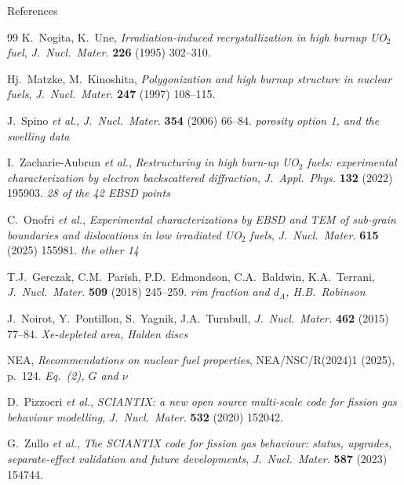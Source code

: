 \documentclass[10pt,aspectratio=169]{beamer}
\begin{document}
\begin{frame}[allowframebreaks]{References}
\begin{thebibliography}{99}
     K.\ Nogita, K.\ Une,
      \emph{Irradiation-induced recrystallization in high burnup UO$_2$ fuel},
      \emph{J.\ Nucl.\ Mater.} \textbf{226} (1995) 302--310.

     Hj.\ Matzke, M.\ Kinoshita,
      \emph{Polygonization and high burnup structure in nuclear fuels},
      \emph{J.\ Nucl.\ Mater.} \textbf{247} (1997) 108--115.

     J.\ Spino \emph{et al.},
      \emph{J.\ Nucl.\ Mater.} \textbf{354} (2006) 66--84.
      \hfill{\itshape porosity option 1, and the swelling data}

     I.\ Zacharie-Aubrun \emph{et al.},
      \emph{Restructuring in high burn-up UO$_2$ fuels: experimental characterization by
      electron backscattered diffraction},
      \emph{J.\ Appl.\ Phys.} \textbf{132} (2022) 195903.
      \hfill{\itshape 28 of the 42 EBSD points}

     C.\ Onofri \emph{et al.},
      \emph{Experimental characterizations by EBSD and TEM of sub-grain boundaries and
      dislocations in low irradiated UO$_2$ fuels},
      \emph{J.\ Nucl.\ Mater.} \textbf{615} (2025) 155981.
      \hfill{\itshape the other 14}

     T.J.\ Gerczak, C.M.\ Parish, P.D.\ Edmondson, C.A.\ Baldwin, K.A.\ Terrani,
      \emph{J.\ Nucl.\ Mater.} \textbf{509} (2018) 245--259.
      \hfill{\itshape rim fraction and $d_A$, H.B.\ Robinson}

     J.\ Noirot, Y.\ Pontillon, S.\ Yagnik, J.A.\ Turnbull,
      \emph{J.\ Nucl.\ Mater.} \textbf{462} (2015) 77--84.
      \hfill{\itshape Xe-depleted area, Halden discs}

     NEA,
      \emph{Recommendations on nuclear fuel properties}, NEA/NSC/R(2024)1 (2025), p.\ 124.
      \hfill{\itshape Eq.~(2), $G$ and $\nu$}

     D.\ Pizzocri \emph{et al.},
      \emph{SCIANTIX: a new open source multi-scale code for fission gas behaviour modelling},
      \emph{J.\ Nucl.\ Mater.} \textbf{532} (2020) 152042.

     G.\ Zullo \emph{et al.},
      \emph{The SCIANTIX code for fission gas behaviour: status, upgrades, separate-effect
      validation and future developments},
      \emph{J.\ Nucl.\ Mater.} \textbf{587} (2023) 154744.

  \end{thebibliography}
\end{frame}
\end{document}
